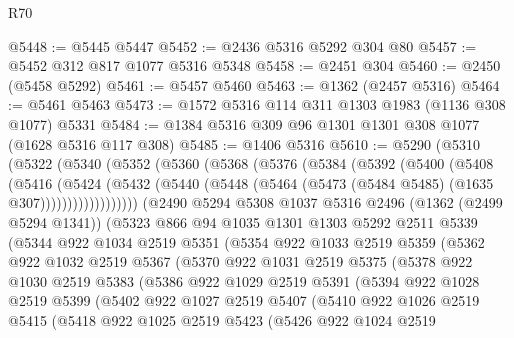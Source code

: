 \begin{lexlean}{R70}
\begin{coremodule}
@5448 := @5445 @5447
@5452 := @2436 @5316 @5292 @304 @80
@5457 := @5452 @312 @817 @1077 @5316 @5348
@5458 := @2451 @304
@5460 := @2450 (@5458 @5292)
@5461 := @5457 @5460
@5463 := @1362 (@2457 @5316)
@5464 := @5461 @5463
@5473 := @1572 @5316 @114 @311 @1303 @1983 (@1136 @308 @1077) @5331
@5484 := @1384 @5316 @309 @96 @1301 @1301 @308 @1077 (@1628 @5316 @117 @308)
@5485 := @1406 @5316
@5610 := @5290
    (@5310
      (@5322
        (@5340
          (@5352
            (@5360
              (@5368
                (@5376
                  (@5384
                    (@5392
                      (@5400
                        (@5408
                          (@5416
                            (@5424
                              (@5432
                                (@5440
                                  (@5448 (@5464 (@5473 (@5484 @5485) (@1635 @307))))))))))))))))))
      (@2490
        @5294
        @5308
        @1037
        @5316
        @2496
        (@1362 (@2499 @5294 @1341))
        (@5323
          @866
          @94
          @1035
          @1301
          @1303
          @5292
          @2511
          @5339
          (@5344
            @922
            @1034
            @2519
            @5351
            (@5354
              @922
              @1033
              @2519
              @5359
              (@5362
                @922
                @1032
                @2519
                @5367
                (@5370
                  @922
                  @1031
                  @2519
                  @5375
                  (@5378
                    @922
                    @1030
                    @2519
                    @5383
                    (@5386
                      @922
                      @1029
                      @2519
                      @5391
                      (@5394
                        @922
                        @1028
                        @2519
                        @5399
                        (@5402
                          @922
                          @1027
                          @2519
                          @5407
                          (@5410
                            @922
                            @1026
                            @2519
                            @5415
                            (@5418
                              @922
                              @1025
                              @2519
                              @5423
                              (@5426
                                @922
                                @1024
                                @2519

\end{coremodule}
\end{lexlean}
